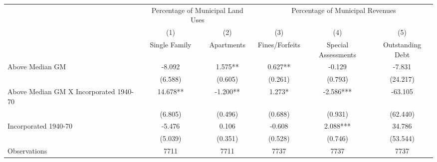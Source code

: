  \begin{tabular}{l*{5}{c}} \toprule
                    &\multicolumn{2}{c}{Percentage of Municipal Land Uses}&\multicolumn{3}{c}{Percentage of Municipal Revenues}\\\cmidrule(lr){2-3}\cmidrule(lr){4-6}
                    &\multicolumn{1}{c}{(1)}&\multicolumn{1}{c}{(2)}&\multicolumn{1}{c}{(3)}&\multicolumn{1}{c}{(4)}&\multicolumn{1}{c}{(5)}\\
                    &\multicolumn{1}{c}{Single Family}&\multicolumn{1}{c}{Apartments}&\multicolumn{1}{c}{Fines/Forfeits}&\multicolumn{1}{c}{Special Assessments}&\multicolumn{1}{c}{Outstanding Debt}\\
\midrule
Above Median GM     &      -8.092   &       1.575** &       0.627** &      -0.129   &      -7.831   \\
                    &     (6.588)   &     (0.605)   &     (0.261)   &     (0.793)   &    (24.217)   \\
\addlinespace
Above Median GM X Incorporated 1940-70&      14.678** &      -1.200** &       1.273*  &      -2.586***&     -63.105   \\
                    &     (6.805)   &     (0.496)   &     (0.688)   &     (0.931)   &    (62.440)   \\
\addlinespace
Incorporated 1940-70&      -5.476   &       0.106   &      -0.608   &       2.088***&      34.786   \\
                    &     (5.039)   &     (0.351)   &     (0.528)   &     (0.746)   &    (53.544)   \\
\midrule
Observations        &        7711   &        7711   &        7737   &        7737   &        7737   \\
 \bottomrule \end{tabular}
